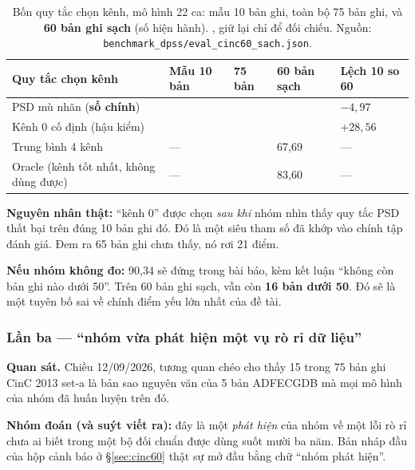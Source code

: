 \begin{table}[H]\centering\small
\caption{Bốn quy tắc chọn kênh, mô hình 22 ca: mẫu 10 bản ghi, toàn bộ 75 bản ghi, và
\textbf{60 bản ghi sạch} (số hiện hành). , giữ lại chỉ để đối chiếu. Nguồn:
\texttt{benchmark\_dpss/eval\_cinc60\_sach.json}.}
\label{tab:doansai_kenh}
\begin{tabular}{@{}L{4.6cm} C{2.6cm} C{2.6cm} C{2.6cm} C{2.0cm}@{}}
\toprule
\textbf{Quy tắc chọn kênh} & \textbf{Mẫu 10 bản } & \textbf{75 bản } &
\textbf{60 bản sạch } & \textbf{Lệch 10 so 60} \\
\midrule
PSD mù nhãn (\textbf{số chính}) &  &  &  & $-4{,}97$ \\
Kênh 0 cố định (hậu kiểm) &  &  &  & $+28{,}56$ \\
Trung bình 4 kênh & --- &  & 67,69 & --- \\
Oracle (kênh tốt nhất, không dùng được) & --- &  & 83,60 & --- \\
\bottomrule
\end{tabular}
\end{table}

\textbf{Nguyên nhân thật:} ``kênh 0'' được chọn \textit{sau khi} nhóm nhìn thấy quy tắc PSD thất bại
trên đúng 10 bản ghi đó. Đó là một siêu tham số đã khớp vào chính tập đánh giá. Đem ra 65 bản ghi chưa
thấy, nó rơi 21 điểm.

\textbf{Nếu nhóm không đo:} 90,34 sẽ đứng trong bài báo, kèm kết luận ``không còn bản ghi nào dưới 50''.
Trên 60 bản ghi sạch, vẫn còn \textbf{16 bản dưới 50}. Đó sẽ là một tuyên bố sai về chính điểm yếu lớn
nhất của đề tài.

\subsubsection{Lần ba --- ``nhóm vừa phát hiện một vụ rò rỉ dữ liệu''}

\textbf{Quan sát.} Chiều 12/09/2026, tương quan chéo cho thấy 15 trong 75 bản ghi CinC 2013 set-a là bản
sao nguyên văn của 5 bản ADFECGDB mà mọi mô hình của nhóm đã huấn luyện trên đó.

\textbf{Nhóm đoán (và suýt viết ra):} đây là một \textit{phát hiện} của nhóm về một lỗi rò rỉ chưa ai
biết trong một bộ đối chuẩn được dùng suốt mười ba năm. Bản nháp đầu của hộp cảnh báo ở
\S\ref{sec:cinc60} thật sự mở đầu bằng chữ ``nhóm phát hiện''.

